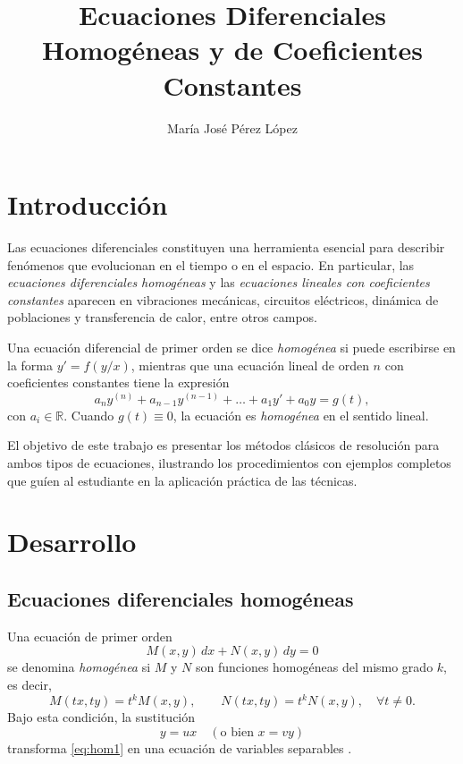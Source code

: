 \documentclass[stu,12pt,donotrepeattitle]{apa7}
\title{Ecuaciones Diferenciales Homogéneas y de Coeficientes Constantes}
\author{María José Pérez López}
\affiliation{Universidad Nacional de Ingeniería, Facultad de Ciencias Matemáticas}
\begin{document}
\maketitle

\section{Introducción}
Las ecuaciones diferenciales constituyen una herramienta esencial para describir fenómenos que evolucionan en el tiempo o en el espacio. En particular, las \emph{ecuaciones diferenciales homogéneas} y las \emph{ecuaciones lineales con coeficientes constantes} aparecen en vibraciones mecánicas, circuitos eléctricos, dinámica de poblaciones y transferencia de calor, entre otros campos.

Una ecuación diferencial de primer orden se dice \emph{homogénea} si puede escribirse en la forma \(y'=f(y/x)\), mientras que una ecuación lineal de orden \(n\) con coeficientes constantes tiene la expresión
\[
a_n y^{(n)}+a_{n-1}y^{(n-1)}+\dots+a_1y'+a_0y=g(t),
\]
con \(a_i\in\mathbb{R}\). Cuando \(g(t)\equiv 0\), la ecuación es \emph{homogénea} en el sentido lineal.

El objetivo de este trabajo es presentar los métodos clásicos de resolución para ambos tipos de ecuaciones, ilustrando los procedimientos con ejemplos completos que guíen al estudiante en la aplicación práctica de las técnicas.

\section{Desarrollo}

\subsection{Ecuaciones diferenciales homogéneas}
Una ecuación de primer orden
\begin{equation}\label{eq:hom1}
M(x,y)\,dx+N(x,y)\,dy=0
\end{equation}
se denomina \emph{homogénea} si \(M\) y \(N\) son funciones homogéneas del mismo grado \(k\), es decir,
\[
M(tx,ty)=t^kM(x,y),\qquad N(tx,ty)=t^kN(x,y),\quad\forall t\neq 0.
\]
Bajo esta condición, la sustitución
\begin{equation}\label{eq:sust}
y=ux\quad(\text{o bien }x=vy)
\end{equation}
transforma \eqref{eq:hom1} en una ecuación de variables separables \cite{Zill2017}.
\end{document}
